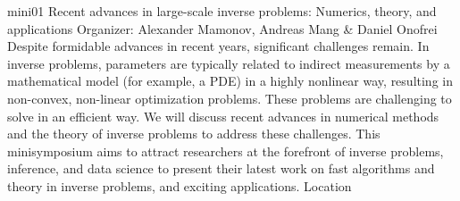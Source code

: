 \mini
{mini01}
{Recent advances in large-scale inverse problems: Numerics, theory, and applications}
{Organizer: Alexander Mamonov, Andreas Mang \& Daniel Onofrei}
{Despite formidable advances in recent years, significant challenges remain. In inverse problems, parameters are typically related to indirect measurements by a mathematical model (for example, a PDE) in a highly nonlinear way, resulting in non-convex, non-linear optimization problems. These problems are challenging to solve in an efficient way. We will discuss recent advances in numerical methods and the theory of inverse problems to address these challenges. This minisymposium aims to attract researchers at the forefront of inverse problems, inference, and data science to present their latest work on fast algorithms and theory in inverse problems, and exciting applications.}
{Location}


